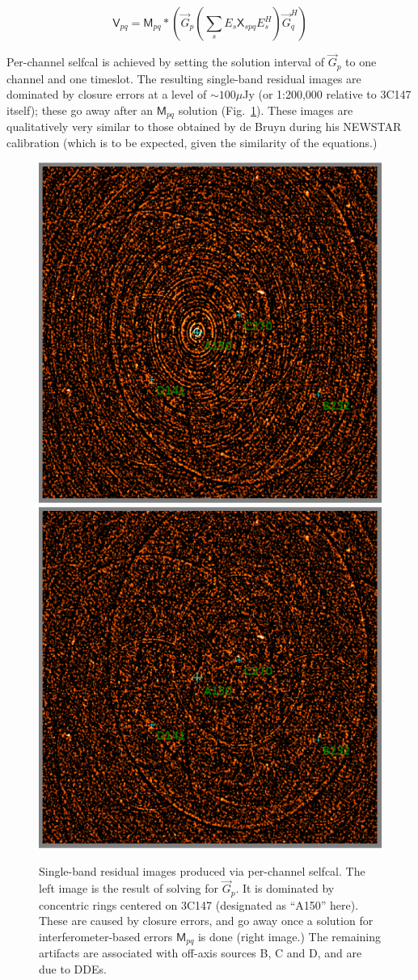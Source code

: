 \documentclass[]{aa}
\newcommand{\herm}{H}
\newcommand{\jones}[2]{\vec {#1}_{#2}}
\newcommand{\jonesT}[2]{\vec {#1}^{\herm}_{#2}}
\newcommand{\coh}[2]{\mathsf{{#1}}_{{#2}}}
\begin{document}
\begin{equation}\label{eq:3C147:perchan}
\coh{V}{pq} = \coh{M}{pq} \ast \left ( \jones{G}{p} \left( \sum_s E_s \coh{X}{spq} E^{\herm}_s \right)  \jonesT{G}{q} \right )
\end{equation}

Per-channel selfcal is achieved by setting the solution interval of $\jones{G}{p}$ to one channel and one timeslot. The resulting single-band residual images are dominated by closure errors at a level of $\sim 100 \mu$Jy (or 1:200,000 relative to 3C147 itself); these go away after an $\coh{M}{pq}$ solution (Fig.~\ref{fig:Gsol}). These images are qualitatively very similar to those obtained by de Bruyn during his NEWSTAR calibration (which is to be expected, given the similarity of the equations.)

\begin{figure}
\begin{centering}
\includegraphics[width=.5\columnwidth]{G_solution}%
\includegraphics[width=.5\columnwidth]{IG_solution}\par
\end{centering}
\caption{\label{fig:Gsol}Single-band residual images produced via per-channel selfcal. The left image is the result of solving for $\jones{G}{p}$. It is dominated by concentric rings centered on 3C147 (designated as ``A150'' here). These are caused by closure errors, and go away once a solution for interferometer-based errors $\coh{M}{pq}$ is done (right image.) The remaining artifacts are associated with off-axis sources B, C and D, and are due to DDEs. 
}
\end{figure}
\end{document}
